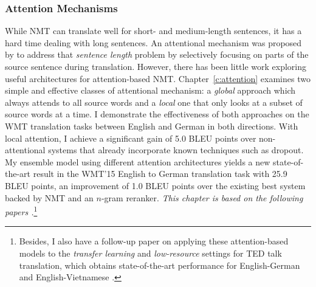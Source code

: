 \subsubsection{Attention Mechanisms} 
While NMT can translate well for short- and medium-length sentences, it 
has a hard time dealing with long sentences.
An attentional mechanism was proposed by  to address that {\it
sentence length} problem by
selectively focusing on parts of the source sentence during translation. However,
there has been little work exploring useful architectures for attention-based
NMT. Chapter~\ref{c:attention} examines two simple and effective classes of attentional
mechanism: a {\it global} approach which always attends to all source words and
a {\it local} one that only looks at a subset of source words at a time. 
I demonstrate the effectiveness of both approaches on the WMT translation
tasks between English and German in both directions. With local
attention, I achieve a significant gain of 5.0 BLEU points over
non-attentional systems that 
already incorporate known techniques such as dropout. My ensemble 
model using different attention architectures yields a new
state-of-the-art result in the WMT'15 English to German
translation task with 25.9 BLEU points, an improvement of 1.0 BLEU points over the existing
best system backed by NMT and an $n$-gram reranker. 
{\it This chapter is based
on the following papers \cite{luong15attn}.}\footnote{ 
Besides, I also have a follow-up paper \cite{luong15iwslt} on applying these attention-based models to
the {\it transfer learning} and {\it low-resource} settings for TED talk translation, which obtains
state-of-the-art performance for English-German and English-Vietnamese \cite{iwslt15}.}

